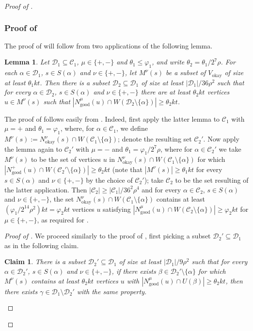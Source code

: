 \documentclass[english]{article}
\theoremstyle{plain}
\newtheorem{lemma}[theorem]{Lemma}
\newtheorem{claim}[theorem]{Claim}
\theoremstyle{remark}
\def\C{\mathcal{C}}
\let\phi\varphi
\def \Vo {V_{\okay}}
\def \Nmu{N^{\mu}_{\good}}
\def \Nnuo{N^{\nu}_{\okay}}
\def \Npg{N^+_{\good}}
\newcommand{\sm}{\setminus}
\DeclareMathOperator{\good}{good}
\DeclareMathOperator{\okay}{okay}
\begin{document}
\begin{proof}[Proof of ]
		\subsubsection{Proof of }
			The proof of  will follow from two applications of the following lemma.

			\def \Mnu {M^{\nu}}
			\def \D {\mathcal{D}}
			\begin{lemma} \label{lem:available-step-2-modified}
				Let $\D_1 \subseteq \C_1$, $\mu \in \{+, -\}$ and $\theta_1 \le \phi_1$, and write $\theta_2 = \theta_1 / 2^7 \rho$. For each $\alpha \in \D_1$, $s \in S(\alpha)$ and $\nu \in \{+, -\}$, let $\Mnu(s)$ be a subset of $\Vo$ of size at least $\theta_1 kt$. Then there is a subset $\D_2 \subseteq \D_1$ of size at least $|\D_1|/36\rho^2$ such that for every $\alpha \in \D_2$, $s \in S(\alpha)$ and $\nu \in \{+, -\}$ there are at least $\theta_2 kt$ vertices $u \in \Mnu(s)$ such that $|\Nmu(u) \cap W(\D_2 \sm \{\alpha\})| \ge \theta_2 kt$.
			\end{lemma}

			The proof of  follows easily from . Indeed, first apply the latter lemma to $\C_1$ with $\mu = +$ and $\theta_1 = \phi_1$, where, for $\alpha \in \C_1$, we define $\Mnu(s) := \Nnuo(s) \cap W(\C_1 \setminus \{\alpha\})$; denote the resulting set $\C_2'$. Now apply the lemma again to $\C_2'$ with $\mu = -$ and $\theta_1 = \phi_1 / 2^7 \rho$, where for $\alpha \in \C_2'$ we take $\Mnu(s)$ to be the set of vertices $u$ in $\Nnuo(s) \cap W(\C_1 \setminus \{\alpha\})$ for which $|\Npg(u) \cap W(\C_2' \sm \{\alpha\})| \ge \theta_2 kt$ (note that $|\Mnu(s)| \ge \theta_1 kt$ for every $s \in S(\alpha)$ and $\nu \in \{+, -\}$ by the choice of $\C_2'$); take $\C_2$ to be the set resulting of the latter application. Then $|\C_2| \ge |\C_1| / 36^2 \rho^4$ and for every $\alpha \in \C_2$, $s \in S(\alpha)$ and $\nu \in \{+, -\}$, the set $\Nnuo(s) \cap W(\C_1 \setminus \{\alpha\})$ contains at least $(\phi_1 / 2^{14} \rho^2) kt = \phi_2 kt$ vertices $u$ satisfying $|\Nmu(u) \cap W(\C_2 \sm \{\alpha\})| \ge \phi_2 kt$ for $\mu \in \{+, -\}$, as required for .

			\begin{proof}[Proof of ]
				We proceed similarly to the proof of , first picking a subset $\D_2' \subseteq \D_1$ as in the following claim.
				\begin{claim} \label{claim:available-three}
					There is a subset $\D_2' \subseteq \D_1$ of size at least $|\D_1|/9\rho^2$ such that for every $\alpha \in \D_2'$, $s \in S(\alpha)$ and $\nu \in \{+, -\}$, if there exists $\beta \in \D_2' \setminus \{\alpha\}$ for which $\Mnu(s)$ contains at least $\theta_2 kt$ vertices $u$ with $|\Nmu(u) \cap U(\beta)| \ge \theta_2 kt$, then there exists $\gamma \in \D_1 \setminus \D_2'$ with the same property.
				\end{claim}


\end{proof}
\end{proof}
\end{document}
